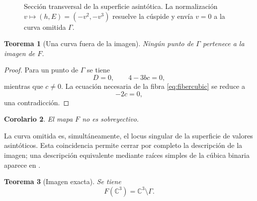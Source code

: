 \documentclass[11pt]{article}
\newtheorem{theorem}{Teorema}[section]
\newtheorem{corollary}[theorem]{Corolario}
\theoremstyle{definition}
\theoremstyle{remark}
\newcommand{\C}{\mathbb{C}}
\begin{document}
\begin{figure}[htbp]
\centering
{}
\caption{Secci\'on transversal de la superficie asint\'otica. La
normalizaci\'on $v\mapsto(h,E)=(-v^2,-v^3)$ resuelve la c\'uspide y env\'ia
$v=0$ a la curva omitida $\Gamma$.}
\label{fig:cusp-normalization}
\end{figure}

\begin{theorem}[Una curva fuera de la imagen]\label{thm:omitted}
Ning\'un punto de $\Gamma$ pertenece a la imagen de $F$.
\end{theorem}

\begin{proof}
Para un punto de $\Gamma$ se tiene
\[
D=0,\qquad 4-3bc=0,
\]
mientras que $c\neq0$. La ecuaci\'on necesaria de la fibra
\eqref{eq:fibercubic} se reduce a
\[
-2c=0,
\]
una contradicci\'on.
\end{proof}

\begin{corollary}
El mapa $F$ no es sobreyectivo.
\end{corollary}

La curva omitida es, simult\'aneamente, el locus singular de la superficie de
valores asint\'oticos. Esta coincidencia permite cerrar por completo la
descripci\'on de la imagen; una descripci\'on equivalente mediante ra\'ices
simples de la c\'ubica binaria aparece en \cite{CounterexampleNote2026}.

\begin{theorem}[Imagen exacta]\label{thm:exact-image}
Se tiene
\[
F(\C^3)=\C^3\setminus\Gamma.
\]
\end{theorem}
\end{document}
